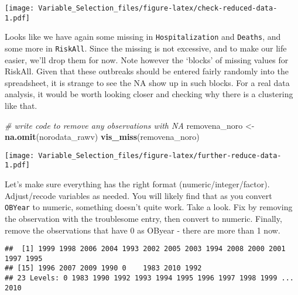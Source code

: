\documentclass[]{article}
\newenvironment{Shaded}{\begin{snugshade}}{\end{snugshade}}
\newcommand{\CommentTok}[1]{\textcolor[rgb]{0.56,0.35,0.01}{\textit{#1}}}
\newcommand{\KeywordTok}[1]{\textcolor[rgb]{0.13,0.29,0.53}{\textbf{#1}}}
\newcommand{\NormalTok}[1]{#1}
\newcommand{\OperatorTok}[1]{\textcolor[rgb]{0.81,0.36,0.00}{\textbf{#1}}}
\newcommand{\StringTok}[1]{\textcolor[rgb]{0.31,0.60,0.02}{#1}}
\begin{document}
\texttt{[image: Variable\_Selection\_files/figure-latex/check-reduced-data-1.pdf]}

Looks like we have again some missing in \texttt{Hospitalization} and
\texttt{Deaths}, and some more in \texttt{RiskAll}. Since the missing is
not excessive, and to make our life easier, we'll drop them for now.
Note however the `blocks' of missing values for RiskAll. Given that
these outbreaks should be entered fairly randomly into the spreadsheet,
it is strange to see the NA show up in such blocks. For a real data
analysis, it would be worth looking closer and checking why there is a
clustering like that.

\begin{Shaded}
\begin{Highlighting}[]
\CommentTok{# write code to remove any observations with NA}
\NormalTok{removena_noro <-}\StringTok{ }\KeywordTok{na.omit}\NormalTok{(norodata_rawv)}
\KeywordTok{vis_miss}\NormalTok{(removena_noro)}
\end{Highlighting}
\end{Shaded}

\texttt{[image: Variable\_Selection\_files/figure-latex/further-reduce-data-1.pdf]}

Let's make sure everything has the right format
(numeric/integer/factor). Adjust/recode variables as needed. You will
likely find that as you convert \texttt{OBYear} to numeric, something
doesn't quite work. Take a look. Fix by removing the observation with
the troublesome entry, then convert to numeric. Finally, remove the
observations that have 0 as OByear - there are more than 1 now.

\begin{Shaded}
\end{Shaded}

\begin{verbatim}
##  [1] 1999 1998 2006 2004 1993 2002 2005 2003 1994 2008 2000 2001 1997 1995
## [15] 1996 2007 2009 1990 0    1983 2010 1992
## 23 Levels: 0 1983 1990 1992 1993 1994 1995 1996 1997 1998 1999 ... 2010
\end{verbatim}

\begin{Shaded}
\end{Shaded}
\end{document}
